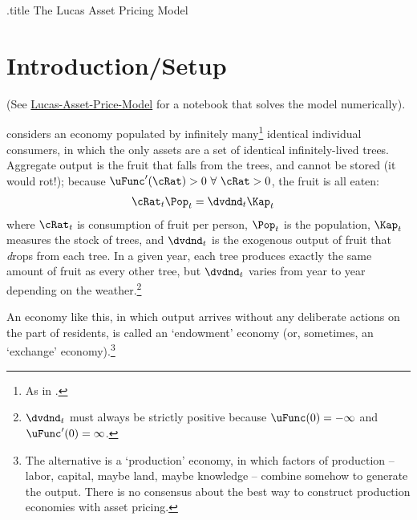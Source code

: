 \documentclass{\handout}
\begin{document}
\handoutHeader

\begin{verbatimwrite}{\jobname.title}
The Lucas Asset Pricing Model
\end{verbatimwrite}

\handoutNameMake

\section{Introduction/Setup}

(See \href{https://econ-ark.org/materials/lucas-asset-price-model?launch}{Lucas-Asset-Price-Model} for a notebook that solves the model numerically).

\cite{lucas:assetpricing} considers an economy populated by infinitely many\footnote{As in \Aggregation.}  identical individual consumers, in which the only assets are a set of identical infinitely-lived trees.  Aggregate output is the fruit that falls from the trees, and cannot be stored (it would rot!); because $\uFunc^{\prime}(\cRat)>0~\forall~\cRat > 0$, the fruit is all eaten:
\begin{equation}\begin{gathered}\begin{aligned}
\cRat_{t}\Pop_{t} & =  \dvdnd_{t}\Kap_{t} \label{eq:CeqY}
\end{aligned}\end{gathered}\end{equation}
where $\cRat_{t}$ is consumption of fruit per person, $\Pop_{t}$ is the population, $\Kap_{t}$ measures the stock of trees, and $\dvdnd_{t}$ is the exogenous output of fruit that \textit{d}rops from each tree.  In a given year, each tree produces exactly the same amount of fruit as every other tree, but $\dvdnd_{t}$ varies from year to year depending on the weather.\footnote{$\dvdnd_{t}$ must always be strictly positive because $\uFunc(0) = -\infty$ and $\uFunc^{\prime}(0)=\infty$.}

An economy like this, in which output arrives without any deliberate actions on the part of residents, is called an `endowment' economy (or, sometimes, an `exchange' economy).\footnote{The alternative is a `production' economy, in which factors of production -- labor, capital, maybe land, maybe knowledge -- combine somehow to generate the output.  There is no consensus about the best way to construct production economies with asset pricing.}   
\end{document}
